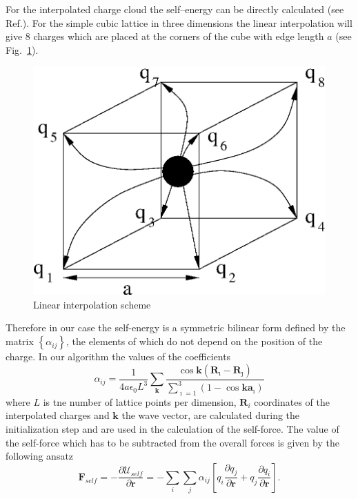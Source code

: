 \documentclass[a4paper, 12pt]{article}
\newcommand{\vect}[1]{\mathbf{#1}}
\begin{document}
For the interpolated charge cloud the self--energy can be directly
calculated (see Ref.\cite{phd_pasichnyk}). For the simple cubic
lattice in three dimensions the linear interpolation will give 8
charges which are placed at the corners of the cube with edge length
$a$ (see Fig.~\ref{fig:charge_assig_cubic_lattice}).
%
\begin{figure} 
  \centering \includegraphics[scale=0.55]{figs/charge_assig_cube.eps}
  \caption{Linear interpolation scheme} 
  \label{fig:charge_assig_cubic_lattice}  
\end{figure}
%
Therefore in our case the self-energy is a symmetric bilinear form
defined by the matrix $\left\{\alpha_{ij}\right\}$, the elements of
which do not depend on the position of the charge. In our algorithm
the values of the coefficients
%
\begin{equation}
  \alpha_{ij}=\frac{1}{4a\epsilon_0L^3}\sum\limits_{\vect k}\frac{\cos \vect k(\vect R_{\imath}-\vect R_{\jmath})}{\sum_{\imath=1}^3(1-\cos\vect
      k\vect a_{\imath})}
\end{equation}
%
where $L$ is tne number of lattice points per dimension, $\vect R_i$ coordinates of the interpolated charges and $\vect k$ the wave vector, are calculated during the initialization step and are used in the
calculation of the self-force. The value of the self-force which has
to be subtracted from the overall forces is given by the following
ansatz
%
\begin{equation}
  \vect F_{self}=-\frac{\partial \mathcal U_{self}}{\partial\vect
    r}=-\sum\limits_i\sum\limits_j\alpha_{ij}\left[q_i\frac{\partial
      q_j}{\partial\vect r}+q_j\frac{\partial q_i}{\partial\vect r}\right].
\end{equation}
%
%
\end{document}
